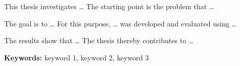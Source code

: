 
This thesis investigates \ldots{} The starting point is the problem that \ldots

The goal is to \ldots{} For this purpose, \ldots{} was developed and evaluated using \ldots

The results show that \ldots{} The thesis thereby contributes to \ldots

\medskip
\noindent\textbf{Keywords:} keyword 1, keyword 2, keyword 3
